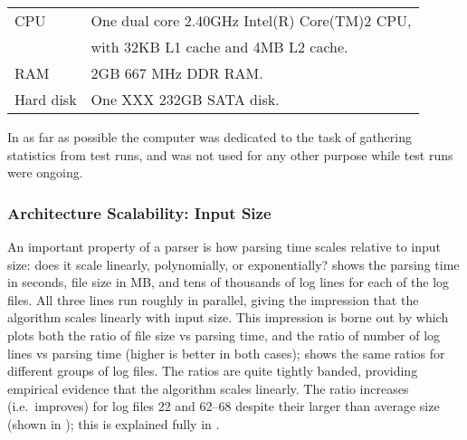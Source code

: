\begin{tabular}[]{ll}

CPU         & One dual core 2.40GHz Intel(R) Core(TM)2 CPU, \\
            & with 32KB L1 cache and 4MB L2 cache. \\
RAM         & 2GB 667 MHz DDR RAM\@. \\
Hard disk   & One XXX 232GB SATA disk. \\

\end{tabular}

In as far as possible the computer was dedicated to the task of gathering
statistics from test runs, and was not used for any other purpose while
test runs were ongoing.

\subsubsection{Architecture Scalability: Input Size}

An important property of a parser is how parsing time scales relative to
input size: does it scale linearly, polynomially, or exponentially?
 shows the
parsing time in seconds, file size in MB, and tens of thousands of log
lines for each of the \numberOFlogFILES{} log files.  All three lines run
roughly in parallel, giving the impression that the algorithm scales
linearly with input size.  This impression is borne out by
 which plots
both the ratio of file size vs parsing time, and the ratio of number of log
lines vs parsing time (higher is better in both cases);  shows the same ratios for
different groups of log files.  The ratios are quite tightly banded,
providing empirical evidence that the algorithm scales linearly.  The ratio
increases (i.e.\ improves) for log files 22 and 62--68 despite their larger
than average size (shown in ); this is explained fully in .  



